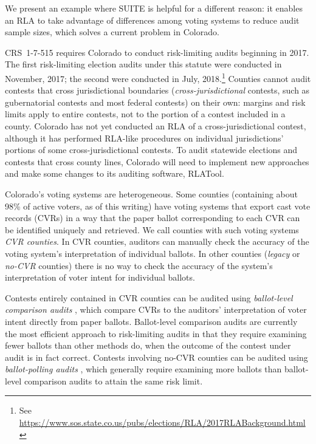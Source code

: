 \documentclass[runningheads]{llncs}
\begin{document}
We present an example where SUITE is helpful for a different reason: 
it enables an RLA to take
advantage of differences among voting systems to reduce audit sample sizes, which solves
a current problem in Colorado.

CRS~1-7-515 requires Colorado to conduct risk-limiting audits beginning in 2017.
The first risk-limiting election audits under this statute were conducted in November, 2017; the second were conducted in July, 2018.\footnote{%
 See \url{https://www.sos.state.co.us/pubs/elections/RLA/2017RLABackground.html}
}
Counties cannot audit contests that cross jurisdictional boundaries (\emph{cross-jurisdictional} contests, such as gubernatorial contests and most federal contests)
on their own: margins and risk limits apply to entire contests, not to the portion of a 
contest included in a county.
Colorado has not yet conducted an RLA of a cross-jurisdictional contest, although it has performed RLA-like procedures on individual jurisdictions' portions of some cross-jurisdictional contests.
To audit statewide elections and contests that cross county lines, Colorado will need to implement new approaches and make some changes to its auditing software, RLATool.

Colorado's voting systems are heterogeneous. 
Some counties (containing about 98\% of active voters, as of this writing) have 
voting systems that export cast vote records (CVRs) in a way that the paper ballot corresponding to each CVR can be identified uniquely and retrieved.
We call counties with such voting systems \emph{CVR counties}.
In CVR counties, auditors can manually check the accuracy of the voting system's interpretation of individual ballots.
In other counties (\emph{legacy} or \emph{no-CVR} counties) there is no way to check the accuracy
of the system's interpretation of voter intent for individual ballots.

Contests entirely contained in CVR counties can be audited using \emph{ballot-level comparison audits} \cite{lindemanStark12}, which compare CVRs to the auditors' interpretation of voter intent directly from paper ballots.
Ballot-level comparison audits are currently the most efficient approach to risk-limiting audits in that they require examining fewer ballots than other methods do, when the outcome of the contest under audit is in fact correct.
Contests involving no-CVR counties can be audited using \emph{ballot-polling audits} \cite{lindemanEtal12,lindemanStark12},  which generally require examining more ballots than ballot-level comparison audits to attain the same risk limit.
\end{document}
